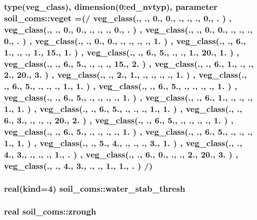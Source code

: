 \subsubsection[{\texorpdfstring{veget}{veget}}]{\setlength{\rightskip}{0pt plus 5cm}type({\bf veg\+\_\+class}), dimension(0\+:{\bf ed\+\_\+nvtyp}), parameter soil\+\_\+coms\+::veget =(/ {\bf veg\+\_\+class}(., ., 0., 0., ., ., ., 0., . ) , {\bf veg\+\_\+class}(., ., 0., 0., ., ., ., 0., . ) , {\bf veg\+\_\+class}(., ., 0., 0., ., ., ., 0., . ) , {\bf veg\+\_\+class}(., ., 0., 0., ., ., ., ., 1. ) , {\bf veg\+\_\+class}(., ., 6., 1., ., ., 1., 15., 1. ) , {\bf veg\+\_\+class}(., ., 6., 5., ., ., 1., 20., 1. ) , {\bf veg\+\_\+class}(., ., 6., 5., ., ., ., 15., 2. ) , {\bf veg\+\_\+class}(., ., 6., 1., ., ., 2., 20., 3. ) , {\bf veg\+\_\+class}(., ., 2., 1., ., ., ., ., 1. ) , {\bf veg\+\_\+class}(., ., 6., 5., ., ., ., 1., 1. ) , {\bf veg\+\_\+class}(., ., 6., 5., ., ., ., ., 1. ) , {\bf veg\+\_\+class}(., ., 6., 5., ., ., ., ., 1. ) , {\bf veg\+\_\+class}(., ., 6., 1., ., ., ., 1., 1. ) , {\bf veg\+\_\+class}(., ., 6., 5., ., ., ., 1., 1. ) , {\bf veg\+\_\+class}(., ., 6., 3., ., ., ., 20., 2. ) , {\bf veg\+\_\+class}(., ., 6., 5., ., ., ., ., 1. ) , {\bf veg\+\_\+class}(., ., 6., 5., ., ., ., ., 1. ) , {\bf veg\+\_\+class}(., ., 6., 5., ., ., ., 1., 1. ) , {\bf veg\+\_\+class}(., ., 5., 4., ., ., ., 3., 1. ) , {\bf veg\+\_\+class}(., ., 4., 3., ., ., ., 1., . ) , {\bf veg\+\_\+class}(., ., 6., 0., ., ., 2., 20., 3. ) , {\bf veg\+\_\+class}(., ., 4., 3., ., ., 1., 1., . ) /)}\hypertarget{namespacesoil__coms_abc30de75cb7efc15f13116fb03fff8bc}{}\label{namespacesoil__coms_abc30de75cb7efc15f13116fb03fff8bc}
\subsubsection[{\texorpdfstring{water\+\_\+stab\+\_\+thresh}{water_stab_thresh}}]{\setlength{\rightskip}{0pt plus 5cm}real(kind=4) soil\+\_\+coms\+::water\+\_\+stab\+\_\+thresh}\hypertarget{namespacesoil__coms_ab3465a7eaa76b6f27830280b15c20d68}{}\label{namespacesoil__coms_ab3465a7eaa76b6f27830280b15c20d68}
\subsubsection[{\texorpdfstring{zrough}{zrough}}]{\setlength{\rightskip}{0pt plus 5cm}real soil\+\_\+coms\+::zrough}\hypertarget{namespacesoil__coms_ae83360d4f03ca2a56ab9de2732d47533}{}\label{namespacesoil__coms_ae83360d4f03ca2a56ab9de2732d47533}
